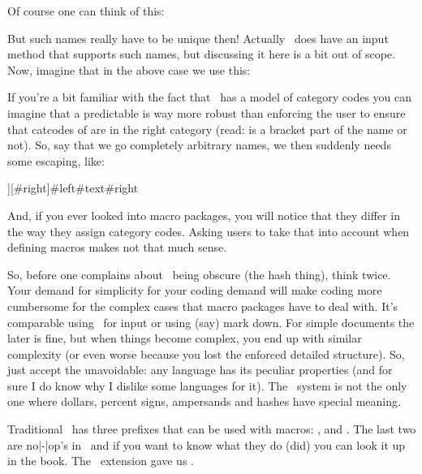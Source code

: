 Of course one can think of this:

\starttyping[option=TEX]
\stoptyping

But such names really have to be unique then! Actually \CONTEXT\ does have an
input method that supports such names, but discussing it here is a bit out of
scope. Now, imagine that in the above case we use this:

\starttyping[option=TEX]
\stoptyping

If you're a bit familiar with the fact that \TEX\ has a model of category codes
you can imagine that a predictable  is way
more robust than enforcing the user to ensure that catcodes of  are
in the right category (read: is a bracket part of the name or not). So, say that
we go completely arbitrary names, we then suddenly needs some escaping, like:

\starttyping[option=TEX]
\def\foo[#{left}][#{right}]{\def\oof#{text}{#{left}#{text}#{right}}}
\stoptyping

And, if you ever looked into macro packages, you will notice that they differ in
the way they assign category codes. Asking users to take that into account when
defining macros makes not that much sense.

So, before one complains about \TEX\ being obscure (the hash thing), think twice.
Your demand for simplicity for your coding demand will make coding more
cumbersome for the complex cases that macro packages have to deal with. It's
comparable using \TEX\ for input or using (say) mark down. For simple documents
the later is fine, but when things become complex, you end up with similar
complexity (or even worse because you lost the enforced detailed structure). So,
just accept the unavoidable: any language has its peculiar properties (and for
sure I do know why I dislike some languages for it). The \TEX\ system is not the
only one where dollars, percent signs, ampersands and hashes have special
meaning.

\stopsectionlevel

\startsectionlevel[title=Prefixes]

Traditional \TEX\ has three prefixes that can be used with macros: \type {\global},
\type {\outer} and \type {\long}. The last two are no|-|op's in \LUAMETATEX\ and
if you want to know what they do (did) you can look it up in the \TEX book. The
\ETEX\ extension gave us \type {\protected}.

